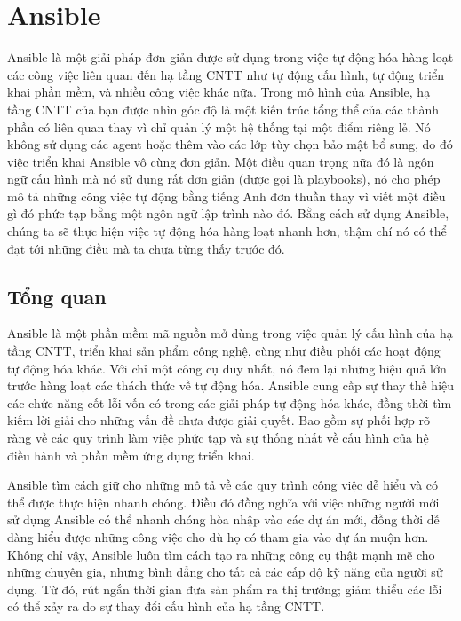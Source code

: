 \section{Ansible}
Ansible là một giải pháp đơn giản được sử dụng trong việc tự động hóa hàng loạt các công việc liên quan đến hạ tầng CNTT như tự động cấu hình, tự động triển khai phần mềm, và nhiều công việc khác nữa. Trong mô hình của Ansible, hạ tầng CNTT của bạn được nhìn góc độ là một kiến trúc tổng thể của các thành phần có liên quan thay vì chỉ quản lý một hệ thống tại một điểm riêng lẻ. Nó không sử dụng các agent hoặc thêm vào các lớp tùy chọn bảo mật bổ sung, do đó việc triển khai Ansible vô cùng đơn giản. Một điều quan trọng nữa đó là ngôn ngữ cấu hình mà nó sử dụng rất đơn giản (được gọi là playbooks), nó cho phép mô tả những công việc tự động bằng tiếng Anh đơn thuần thay vì viết một điều gì đó phức tạp bằng một ngôn ngữ lập trình nào đó. Bằng cách sử dụng Ansible, chúng ta sẽ thực hiện việc tự động hóa hàng loạt nhanh hơn, thậm chí nó có thể đạt tới những điều mà ta chưa từng thấy trước đó.

\subsection{Tổng quan}

Ansible là một phần mềm mã nguồn mở dùng trong việc quản lý cấu hình của hạ tầng CNTT, triển khai sản phẩm công nghệ, cùng như điều phối các hoạt động tự động hóa khác. Với chỉ một công cụ duy nhất, nó đem lại những hiệu quả lớn trước hàng loạt các thách thức về tự động hóa. Ansible cung cấp sự thay thế hiệu các chức năng cốt lỗi vốn có trong các giải pháp tự động hóa khác, đồng thời tìm kiếm lời giải cho những vấn đề chưa được giải quyết. Bao gồm sự phối hợp rõ ràng về các quy trình làm việc phức tạp và sự thống nhất về cấu hình của hệ điều hành và phần mềm ứng dụng triển khai.

\newpage
\clearpage

Ansible tìm cách giữ cho những mô tả về các quy trình công việc dễ hiểu và có thể được thực hiện nhanh chóng. Điều đó đồng nghĩa với việc những người mới sử dụng Ansible có thể nhanh chóng hòa nhập vào các dự án mới, đồng thời dễ dàng hiểu được những công việc cho dù họ có tham gia vào dự án muộn hơn. Không chỉ vậy, Ansible luôn tìm cách tạo ra những công cụ thật mạnh mẽ cho những chuyên gia, nhưng bình đẳng cho tất cả các cấp độ kỹ năng của người sử dụng. Từ đó, rút ngắn thời gian đưa sản phẩm ra thị trường; giảm thiểu các lỗi có thể xảy ra do sự thay đổi cấu hình của hạ tầng CNTT.

